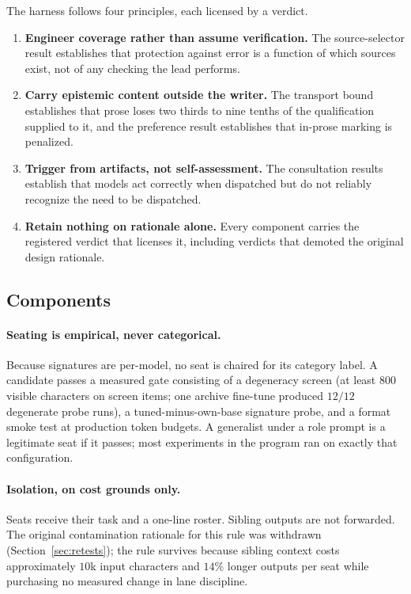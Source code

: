 \documentclass[11pt]{article}
\begin{document}
The harness follows four principles, each licensed by a verdict.

\begin{enumerate}
\item \textbf{Engineer coverage rather than assume verification.} The
source-selector result establishes that protection against error is a
function of which sources exist, not of any checking the lead performs.
\item \textbf{Carry epistemic content outside the writer.} The
transport bound establishes that prose loses two thirds to nine tenths
of the qualification supplied to it, and the preference result
establishes that in-prose marking is penalized.
\item \textbf{Trigger from artifacts, not self-assessment.} The
consultation results establish that models act correctly when
dispatched but do not reliably recognize the need to be dispatched.
\item \textbf{Retain nothing on rationale alone.} Every component
carries the registered verdict that licenses it, including verdicts
that demoted the original design rationale.
\end{enumerate}

\subsection{Components}

\paragraph{Seating is empirical, never categorical.} Because
signatures are per-model, no seat is chaired for its category label. A
candidate passes a measured gate consisting of a degeneracy screen (at
least $800$ visible characters on screen items; one archive fine-tune
produced $12/12$ degenerate probe runs), a tuned-minus-own-base
signature probe, and a format smoke test at production token budgets. A
generalist under a role prompt is a legitimate seat if it passes; most
experiments in the program ran on exactly that configuration.

\paragraph{Isolation, on cost grounds only.} Seats receive their task
and a one-line roster. Sibling outputs are not forwarded. The original
contamination rationale for this rule was withdrawn
(Section~\ref{sec:retests}); the rule survives because sibling context
costs approximately $10$k input characters and $14\%$ longer outputs
per seat while purchasing no measured change in lane discipline.
\end{document}
